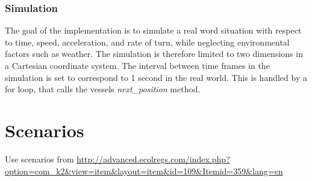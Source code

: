 














\subsection{Simulation}
The goal of the implementation is to simulate a real word situation with respect to time, speed, acceleration, and rate of turn, while neglecting  environmental factors such as weather. 
The simulation is therefore limited to two dimensions in a Cartesian coordinate system. 
The interval between time frames in the simulation is set to correspond to 1 second in the real world. 
This is handled by a for loop, that calls the vessels \textit{next\_position} method.
\chapter{Scenarios}
Use scenarios from \url{http://advanced.ecolregs.com/index.php?option=com_k2&view=item&layout=item&id=109&Itemid=359&lang=en}
